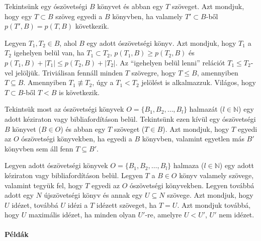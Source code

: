\documentclass{article}
\begin{document}
Tekintsünk egy ószövetségi $B$ könyvet és abban egy $T$ szöveget. Azt mondjuk, hogy egy $T\subset B$ szöveg
egyedi a $B$ könyvben, ha valamely $T'\subset B$-ből $p(T',B)=p(T,B)$ következik.

Legyen $T_1,T_2\in B$, ahol $B$ egy adott ószövetségi könyv. Azt mondjuk, hogy $T_1$ a $T_2$ igehelyen
belül van, ha $T_1\subset T_2$, $p(T_1,B)\geq p(T_2,B)$ és $p(T_1,B)+|T_1|\leq p(T_2,B)+|T_2|$.
Az ``igehelyen belül lenni'' relációt $T_1\leq T_2$-vel jelöljük. Triviálisan fennáll minden
$T$ szövegre, hogy $T\leq B$, amennyiben $T\subseteq B$. Amennyiben $T_1\not\equiv T_2$, úgy
a $T_1<T_2$ jelölést is alkalmazzuk. Világos, hogy $T\subset B$-ből $T<B$ is következik.

Tekintsük most az ószövetségi könyvek $O=\{B_1,B_2,\ldots,B_l\}$ halmazát ($l\in\mathbb{N}$) egy adott kéziraton
vagy bibliafordításon belül.
Tekintsünk ezen kívül egy ószövetségi $B$ könyvet ($B\in O$) és abban egy $T$ szöveget ($T\in B$). Azt mondjuk, hogy
$T$ egyedi az $O$ ószövetségi könyvekben, ha egyedi a $B$ könyvben, valamint egyetlen más $B'$ könyvben
sem áll fenn $T\subseteq B'$.

Legyen adott ószövetségi könyvek $O=\{B_1,B_2,\ldots,B_l\}$ halmaza ($l\in\mathbb{N}$) egy adott kéziraton 
vagy bibliafordításon belül.
Legyen $T$ a $B\in O$ könyv valamely szövege, valamint tegyük fel, hogy $T$ egyedi az $O$ ószövetségi könyvekben.
Legyen továbbá adott egy $N$ újszövetségi könyv és annak egy $U\subseteq N$ szövege.
Azt mondjuk, hogy $U$ idézet, továbbá $U$ idézi a $T$ idézett szöveget, ha $T=U$. Azt mondjuk továbbá, hogy $U$ maximális idézet,
ha minden olyan $U'$-re, amelyre $U<U'$, $U'$ nem idézet.

\paragraph{Példák}
\end{document}
